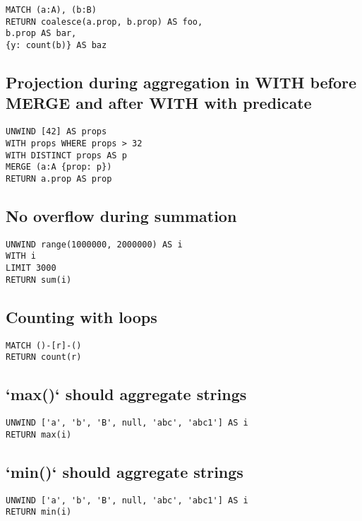 \begin{lstlisting}
MATCH (a:A), (b:B)
RETURN coalesce(a.prop, b.prop) AS foo,
b.prop AS bar,
{y: count(b)} AS baz
\end{lstlisting}

\subsection{Projection during aggregation in WITH before MERGE and after WITH with predicate}

\begin{lstlisting}
UNWIND [42] AS props
WITH props WHERE props > 32
WITH DISTINCT props AS p
MERGE (a:A {prop: p})
RETURN a.prop AS prop
\end{lstlisting}

\subsection{No overflow during summation}

\begin{lstlisting}
UNWIND range(1000000, 2000000) AS i
WITH i
LIMIT 3000
RETURN sum(i)
\end{lstlisting}

\subsection{Counting with loops}

\begin{lstlisting}
MATCH ()-[r]-()
RETURN count(r)
\end{lstlisting}

\subsection{`max()` should aggregate strings}

\begin{lstlisting}
UNWIND ['a', 'b', 'B', null, 'abc', 'abc1'] AS i
RETURN max(i)
\end{lstlisting}

\subsection{`min()` should aggregate strings}

\begin{lstlisting}
UNWIND ['a', 'b', 'B', null, 'abc', 'abc1'] AS i
RETURN min(i)
\end{lstlisting}
